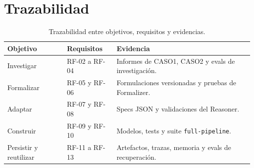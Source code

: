 \section{Trazabilidad}

\begin{table}[H]
\begin{center}
\small
\begin{tabular}{|p{3cm}|p{3.1cm}|p{6.2cm}|} \hline
\textbf{Objetivo} & \textbf{Requisitos} & \textbf{Evidencia} \\ \hline
Investigar & RF-02 a RF-04 & Informes de CASO1, CASO2 y evals de investigación. \\ \hline
Formalizar & RF-05 y RF-06 & Formulaciones versionadas y pruebas de Formalizer. \\ \hline
Adaptar & RF-07 y RF-08 & Specs JSON y validaciones del Reasoner. \\ \hline
Construir & RF-09 y RF-10 & Modelos, tests y suite \texttt{full-pipeline}. \\ \hline
Persistir y reutilizar & RF-11 a RF-13 & Artefactos, trazas, memoria y evals de recuperación. \\ \hline
\end{tabular}
\caption{Trazabilidad entre objetivos, requisitos y evidencias.}
\end{center}
\end{table}
